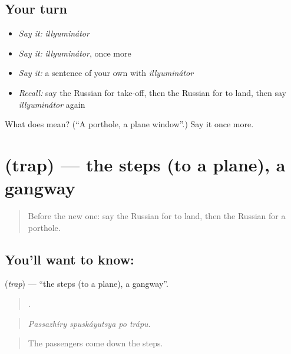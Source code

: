 \subsection*{Your turn}
\begin{itemize}
\raggedright
  \item \emph{Say it:} \emph{illyuminátor}
  \item \emph{Say it:} \emph{illyuminátor}, once more
  \item \emph{Say it:} a sentence of your own with \emph{illyuminátor}
  \item \emph{Recall:} say the Russian for take-off, then the Russian for to land, then say \emph{illyuminátor} again
\end{itemize}

\begin{tcolorbox}[breakable,colback=teal!4,colframe=teal!35!black,title={Before you move on}]
What does  mean? (\textquotedblleft{}A porthole, a plane window\textquotedblright{}.) Say it once more.
\end{tcolorbox}
\section[\texorpdfstring{\ru{трап} (trap)}{трап (trap)}]{ (trap) — the steps (to a plane), a gangway}

\label{lesson:RU-C421-trap}



\begin{quote}
Before the new one: say the Russian for to land, then the Russian for a porthole.
\end{quote}

\subsection*{You'll want to know: }
\textbf{} (\emph{trap}) — \textquotedblleft{}the steps (to a plane), a gangway\textquotedblright{}.

\begin{quote}
   .
\end{quote}

\begin{quote}
\emph{Passazhíry spuskáyutsya po trápu.}
\end{quote}

\begin{quote}
The passengers come down the steps.
\end{quote}

